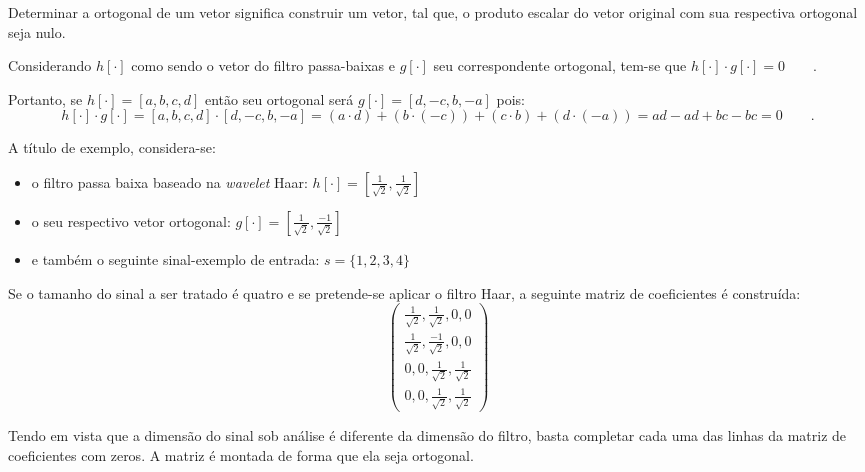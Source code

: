 \documentclass[a4paper,12pt,openright,oneside]{book}
\newenvironment{myenv}[1]
  {\begin{spacing}{#1}}
  {\end{spacing}}
\begin{document}
\begin{myenv}{1.5}
							\par Determinar a ortogonal de um vetor significa construir um vetor, tal que, o produto escalar do vetor original com sua respectiva ortogonal seja nulo.
							
							\par Considerando $h[\cdot]$ como sendo o vetor do filtro passa-baixas e $g[\cdot]$ seu correspondente ortogonal, tem-se que $h[\cdot] \cdot g[\cdot] = 0 \qquad .$
							\par Portanto, se $h[\cdot]=[a, b, c, d]$ então seu ortogonal será $g[\cdot]=[d, -c, b, -a]$ pois:
							$$
							h[\cdot] \cdot g[\cdot]  =  [a, b, c, d] \cdot [d, -c, b, -a] = (a \cdot d) + (b \cdot (-c)) + (c \cdot b) + (d \cdot (-a)) = ad - ad + bc - bc = 0 \qquad.
							$$
							
							\par A título de exemplo, considera-se:
							\begin{itemize}
								\item o filtro passa baixa baseado na \textit{wavelet} Haar: $h[\cdot] = [\frac{1}{\sqrt{2}}, \frac{1}{\sqrt{2}}]$
								\item o seu respectivo vetor ortogonal: $g[\cdot] = [\frac{1}{\sqrt{2}}, \frac{-1}{\sqrt{2}}]$
								\item e também o seguinte sinal-exemplo de entrada: $s = \{1,2,3,4\}$
							\end{itemize}
							
							\par Se o tamanho do sinal a ser tratado é quatro e se pretende-se aplicar o filtro Haar, a seguinte matriz de coeficientes é construída:
							\begin{equation}
								\begin{pmatrix}
									\frac{1}{\sqrt{2}}, \frac{1}{\sqrt{2}}, 0, 0\\
									\frac{1}{\sqrt{2}}, \frac{-1}{\sqrt{2}}, 0, 0\\
									0, 0, \frac{1}{\sqrt{2}}, \frac{1}{\sqrt{2}}\\
									0, 0, \frac{1}{\sqrt{2}}, \frac{1}{\sqrt{2}}
									\label{eq:haarFilters}
								\end{pmatrix} 
							\end{equation}
							\par Tendo em vista que a dimensão do sinal sob análise é diferente da dimensão do filtro, basta completar cada uma das linhas da matriz de coeficientes com zeros. A matriz é montada de forma que ela seja ortogonal.
							

\end{myenv}
\end{document}
